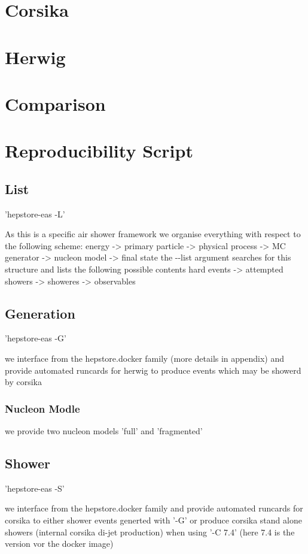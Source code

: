 

\section{Corsika}
\section{Herwig}
\section{Comparison}
\section{Reproducibility Script}


\subsection{List}
'hepstore-eas -L'

As this is a specific air shower framework we organise everything with
respect to the following scheme: energy -> primary particle ->
physical process -> MC generator -> nucleon model -> final state the
-{}-list argument searches for this structure and lists the following
possible contents hard events -> attempted showers -> showeres ->
observables

\subsection{Generation}

'hepstore-eas -G'

we interface from the hepstore.docker family (more details in
appendix) and provide automated runcards for herwig to produce events
which may be showerd by corsika

\subsubsection{Nucleon Modle}

we provide two nucleon models 'full' and 'fragmented'

\subsection{Shower}

'hepstore-eas -S'

we interface from the hepstore.docker family and provide automated
runcards for corsika to either shower events generted with '-G' or
produce corsika stand alone showers (internal corsika di-jet
production) when using '-C 7.4' (here 7.4 is the version vor the
docker image)

